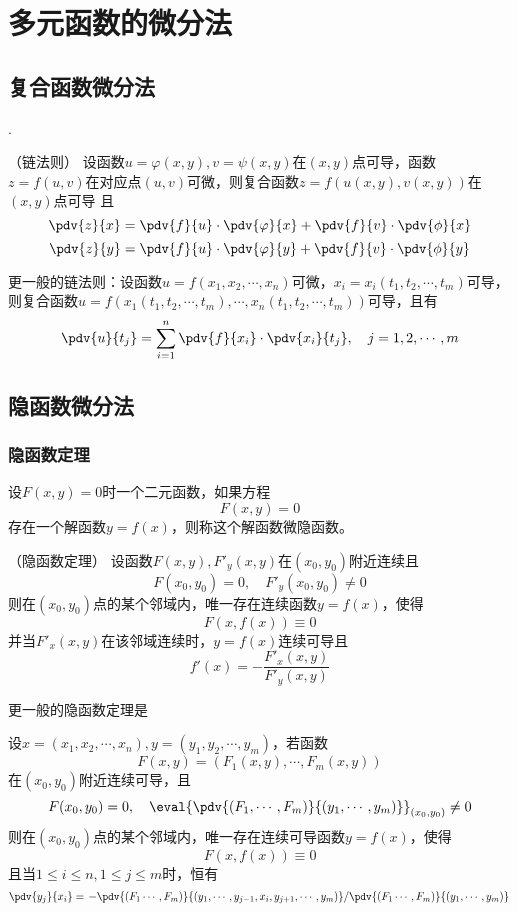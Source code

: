 \section{多元函数的微分法}
\subsection{复合函数微分法}
.
\begin{theorem}
    （链法则）
    \label{th:链法则}
    设函数$u=\varphi(x,y),v=\psi(x,y)$在$(x,y)$点可导，函数$z=f(u,v)$在对应点$(u,v)$可微，则复合函数$z=f(u(x,y),v(x,y))$在$(x,y)$点可导
    且
    \[
        \pdv{z}{x} = \pdv{f}{u}\cdot\pdv{\varphi}{x} + \pdv{f}{v}\cdot\pdv{\phi}{x}
    \]
    \[
        \pdv{z}{y} = \pdv{f}{u}\cdot\pdv{\varphi}{y} + \pdv{f}{v}\cdot\pdv{\phi}{y}
    \]
\end{theorem}

\begin{theorem}
    更一般的链法则：设函数$u=f(x_1,x_2,\cdots,x_n)$可微，$x_i=x_i(t_1,t_2,\cdots,t_m)$可导，则复合函数$u=f(x_1(t_1,t_2,\cdots,t_m),\cdots,x_n(t_1,t_2,\cdots,t_m))$可导，且有
    \[
        \pdv{u}{t_j} = \sum_{i=1}^n \pdv{f}{x_i}\cdot\pdv{x_i}{t_j}, \quad j = 1,2,\cdots,m
    \]
\end{theorem}

\subsection{隐函数微分法}
\subsubsection{隐函数定理}
设$F(x,y)=0$时一个二元函数，如果方程
\[ F(x,y) = 0 \]
存在一个解函数$y=f(x)$，则称这个解函数微隐函数。
\begin{theorem}
    （隐函数定理）
    \label{th:隐函数定理}
    设函数$F(x,y),F'_y(x,y)$在$(x_0,y_0)$附近连续且
    \[ F(x_0,y_0) = 0, \quad F'_y(x_0,y_0)\neq 0 \]
    则在$(x_0,y_0)$点的某个邻域内，唯一存在连续函数$y=f(x)$，使得
    \[ F(x,f(x)) \equiv 0 \]
    并当$F'_x(x,y)$在该邻域连续时，$y=f(x)$连续可导且
    \[ f'(x) = - \frac{F'_x(x,y)}{F'_y(x,y)} \]
\end{theorem}

更一般的隐函数定理是
\begin{theorem}
    设$x=(x_1,x_2,\cdots,x_n),y=(y_1,y_2,\cdots,y_m)$，若函数
    \[ F(x,y) = (F_1(x,y),\cdots,F_m(x,y)) \]
    在$(x_0,y_0)$附近连续可导，且
    \[ F(x_0,y_0) = 0, \quad\eval{\pdv{(F_1,\cdots,F_m)}{(y_1,\cdots,y_m)}}_{(x_0,y_0)} \neq 0 \]
    则在$(x_0,y_0)$点的某个邻域内，唯一存在连续可导函数$y=f(x)$，使得
    \[ F(x,f(x))\equiv 0 \]
    且当$1\leq i \leq n, 1\leq j\leq m$时，恒有
    \[
        \pdv{y_j}{x_i}
        =
        \left.
        - \pdv{(F_1\cdots,F_m)}{(y_1,\cdots,y_{j-1},x_i,y_{j+1},\cdots,y_m)}
        \middle/
        \pdv{(F_1\cdots,F_m)}{(y_1,\cdots,y_m)}
        \right.
    \]
\end{theorem}

